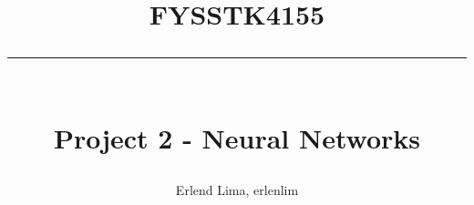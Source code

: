 \newcommand{\horrule}[1]{\rule{\linewidth}{#1}} %

\title{
\large \textsc{FYSSTK4155} \\ [25pt]
\horrule{0.5pt} \\[0.4cm]
\huge Project 2 - Neural Networks}

\author{Erlend Lima, erlenlim}

